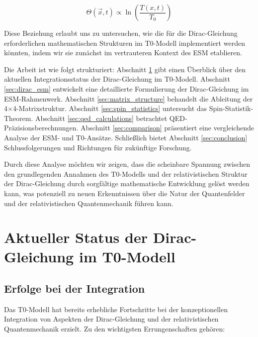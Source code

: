 \documentclass[12pt,a4paper]{article}
\newcommand{\Tfieldt}{T(x,t)}
\newcommand{\Tzero}{T_0}
\newcommand{\vecx}{\vec{x}}
\begin{document}
	\begin{equation}
		\Theta(\vecx,t) \propto \ln\left(\frac{\Tfieldt}{\Tzero}\right)
	\end{equation}
	
	Diese Beziehung erlaubt uns zu untersuchen, wie die für die Dirac-Gleichung erforderlichen mathematischen Strukturen im T0-Modell implementiert werden könnten, indem wir sie zunächst im vertrauteren Kontext des ESM etablieren.
	
	Die Arbeit ist wie folgt strukturiert: Abschnitt \ref{sec:current_status} gibt einen Überblick über den aktuellen Integrationsstatus der Dirac-Gleichung im T0-Modell. Abschnitt \ref{sec:dirac_esm} entwickelt eine detaillierte Formulierung der Dirac-Gleichung im ESM-Rahmenwerk. Abschnitt \ref{sec:matrix_structure} behandelt die Ableitung der 4$\times$4-Matrixstruktur. Abschnitt \ref{sec:spin_statistics} untersucht das Spin-Statistik-Theorem. Abschnitt \ref{sec:qed_calculations} betrachtet QED-Präzisionsberechnungen. Abschnitt \ref{sec:comparison} präsentiert eine vergleichende Analyse der ESM- und T0-Ansätze. Schließlich bietet Abschnitt \ref{sec:conclusion} Schlussfolgerungen und Richtungen für zukünftige Forschung.
	
	Durch diese Analyse möchten wir zeigen, dass die scheinbare Spannung zwischen den grundlegenden Annahmen des T0-Modells und der relativistischen Struktur der Dirac-Gleichung durch sorgfältige mathematische Entwicklung gelöst werden kann, was potenziell zu neuen Erkenntnissen über die Natur der Quantenfelder und der relativistischen Quantenmechanik führen kann.
	
	\section{Aktueller Status der Dirac-Gleichung im T0-Modell}
	\label{sec:current_status}
	
	\subsection{Erfolge bei der Integration}
	\label{subsec:achievements}
	
	Das T0-Modell hat bereits erhebliche Fortschritte bei der konzeptionellen Integration von Aspekten der Dirac-Gleichung und der relativistischen Quantenmechanik erzielt. Zu den wichtigsten Errungenschaften gehören:
	
\end{document}
